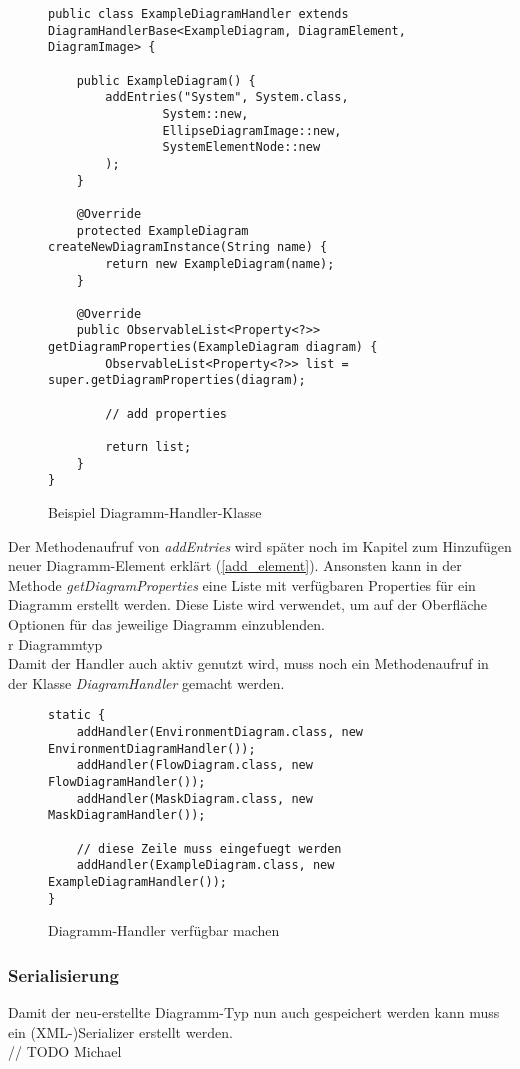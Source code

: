 \begin{figure}[h!]
	\centering
	\begin{lstlisting}
public class ExampleDiagramHandler extends DiagramHandlerBase<ExampleDiagram, DiagramElement, DiagramImage> {

    public ExampleDiagram() {
        addEntries("System", System.class,
                System::new,
                EllipseDiagramImage::new,
                SystemElementNode::new
        );
    }

    @Override
    protected ExampleDiagram createNewDiagramInstance(String name) {
        return new ExampleDiagram(name);
    }
    
    @Override
    public ObservableList<Property<?>> getDiagramProperties(ExampleDiagram diagram) {
        ObservableList<Property<?>> list = super.getDiagramProperties(diagram);

		// add properties

        return list;
    }
}
	\end{lstlisting}
	\label{diagram_handler}
	\caption{Beispiel Diagramm-Handler-Klasse}
\end{figure}
Der Methodenaufruf von \textit{addEntries} wird später noch im Kapitel zum Hinzufügen neuer Diagramm-Element
erklärt (\ref{add_element}). Ansonsten kann in der Methode \textit{getDiagramProperties} eine Liste mit verfügbaren
Properties für ein Diagramm erstellt werden. Diese Liste wird verwendet, um auf der Oberfläche Optionen für das
jeweilige Diagramm einzublenden.
\\r Diagrammtyp
\\
Damit der Handler auch aktiv genutzt wird, muss noch ein Methodenaufruf in der Klasse \textit{DiagramHandler} gemacht
werden.

\begin{figure}[h!]
	\centering
	\begin{lstlisting}
static {
    addHandler(EnvironmentDiagram.class, new EnvironmentDiagramHandler());
    addHandler(FlowDiagram.class, new FlowDiagramHandler());
    addHandler(MaskDiagram.class, new MaskDiagramHandler());
        
    // diese Zeile muss eingefuegt werden
    addHandler(ExampleDiagram.class, new ExampleDiagramHandler());
}
	\end{lstlisting}
	\label{diagram_handler}
	\caption{Diagramm-Handler verfügbar machen}
\end{figure}
\subsubsection{Serialisierung}
Damit der neu-erstellte Diagramm-Typ nun auch gespeichert werden kann muss ein (XML-)Serializer erstellt werden.
\\
// TODO Michael

